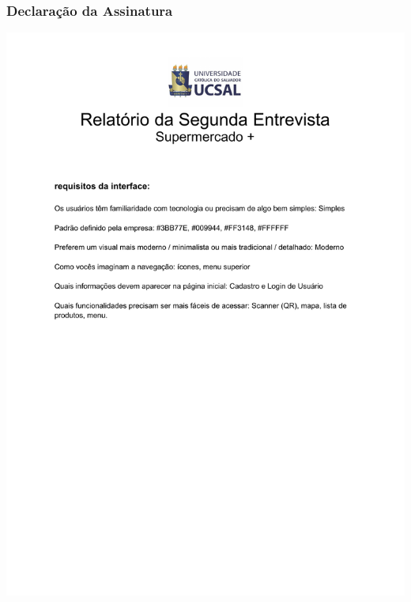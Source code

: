 \documentclass[12pt,oneside,a4paper,article]{abntex2}
\begin{document}
    \subsubsection{Declaração da Assinatura}
    \includegraphics[page=2, width=\textwidth]{imagens-template/arquivos/segunda entrevista.pdf}
\end{document}
